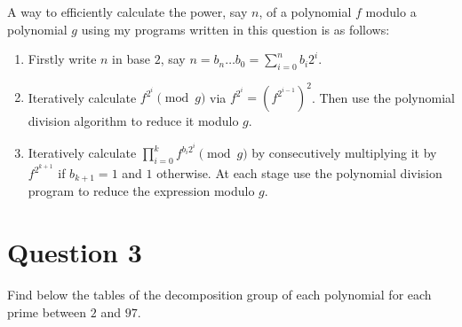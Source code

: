 \documentclass{article}
\begin{document}
A way to efficiently calculate the power,  say $n$, of a polynomial $f$ modulo a polynomial $g$ using my programs written in this question is as follows:
	\begin{enumerate}
		\item Firstly write $n$ in base $2$,  say $n=b_n\ldots b_0=\sum_{i=0}^nb_i2^{i}$. 
		\item Iteratively calculate $f^{2^i}\pmod g$ via $f^{2^i}=(f^{2^{i-1}})^2$.  Then use the polynomial division algorithm to reduce it modulo $g$.
		\item Iteratively calculate $\prod_{i=0}^kf^{b_i2^i}\pmod g$ by consecutively multiplying it by $f^{2^{k+1}}$  if $b_{k+1}=1$ and $1$ otherwise.  At each stage use the polynomial division program to reduce the expression modulo $g$.
	\end{enumerate} 

\section{Question 3}
Find below the tables of the decomposition group of each polynomial for each prime between $2$ and $97$.
\end{document}
